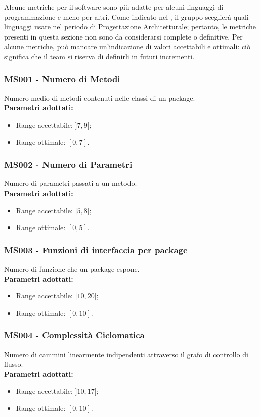 Alcune metriche per il software sono più adatte per alcuni linguaggi di programmazione e meno per altri. Come indicato nel \PdP , il gruppo \gruppo \space sceglierà quali linguaggi usare nel periodo di Progettazione Architetturale; pertanto, le metriche presenti in questa sezione non sono da considerarsi complete o definitive.\newline
Per alcune metriche, può mancare un'indicazione di valori accettabili e ottimali: ciò significa che il team si riserva di definirli in futuri incrementi.

\subsubsection{MS001 - Numero di Metodi}\mbox{}
Numero medio di metodi contenuti nelle classi di un package. \\[0,2cm]
\textbf{Parametri adottati:}
\begin{itemize}
	\item Range accettabile: $ ]7,9]$;
	\item Range ottimale: $[0,7]$.
\end{itemize}

\subsubsection{MS002 - Numero di Parametri}\mbox{}
Numero di parametri passati a un metodo. \\[0,2cm]
\textbf{Parametri adottati:}
\begin{itemize}
	\item Range accettabile: $ ]5,8]$;
	\item Range ottimale: $[0,5]$.
\end{itemize}

\subsubsection{MS003 - Funzioni di interfaccia per package}\mbox{}
Numero di funzione che un package espone. \\[0,2cm]
\textbf{Parametri adottati:}
\begin{itemize}
	\item Range accettabile: $ ]10,20]$;
	\item Range ottimale: $[0,10]$.
\end{itemize}

\subsubsection{MS004 - Complessità Ciclomatica}\mbox{}
Numero di cammini linearmente indipendenti attraverso il grafo di controllo di flusso. \\[0,2cm]
\textbf{Parametri adottati:}
\begin{itemize}
	\item Range accettabile: $ ]10,17]$;
	\item Range ottimale: $[0,10]$.
\end{itemize}

